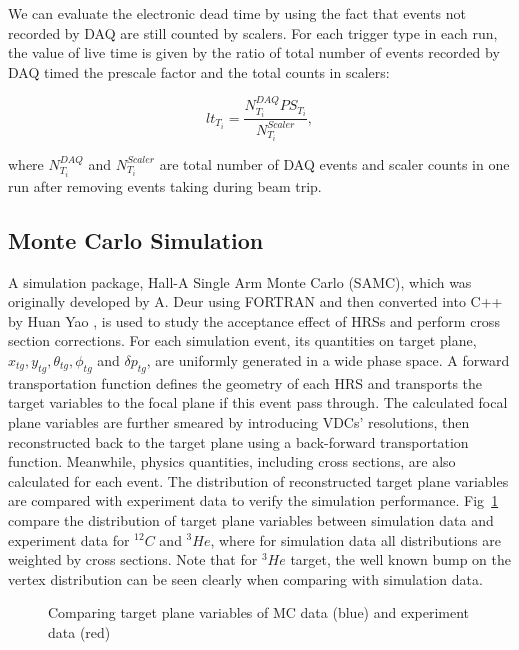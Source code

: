 We can evaluate the electronic dead time by using the fact that events not recorded by DAQ are still counted by scalers. For each trigger type in each run, the value of live time is given by the ratio of total number of events recorded by DAQ timed the prescale factor and the total counts in scalers:

\begin{equation}
  lt_{T_{i}} = \frac{N_{T_{i}}^{DAQ} PS_{T_{i}}}{N_{T_{i}}^{Scaler}},
\end{equation}

where $N_{T_{i}}^{DAQ}$ and $N_{T_{i}}^{Scaler}$ are total number of DAQ events and scaler counts in one run after removing events taking during beam trip.

\subsection{Monte Carlo Simulation}

A simulation package, Hall-A Single Arm Monte Carlo (SAMC), which was originally developed by A. Deur \cite{} using FORTRAN and then converted into C++ by Huan Yao \cite{}, is used to study the acceptance effect of HRSs and perform cross section corrections. For each simulation event, its quantities on target plane, $x_{tg},y_{tg}, \theta_{tg}, \phi_{tg}$ and $\delta p_{tg}$, are uniformly generated in a wide phase space. A forward transportation function defines the  geometry of each HRS and transports the target variables to the focal plane if this event pass through. The calculated focal plane variables are further smeared by introducing VDCs' resolutions, then reconstructed back to the target plane  using a back-forward transportation function. Meanwhile, physics quantities, including cross sections, are also calculated for each event. The distribution of reconstructed target plane variables are compared with experiment data to verify the simulation performance. Fig~\ref{samc_tg} compare the distribution of target plane variables between simulation data and experiment data for $^{12}C$ and $^{3}He$, where for simulation data all distributions are weighted by cross sections. Note that for $^{3}He$ target, the well known bump on the vertex distribution can be seen clearly when comparing with simulation data.

\begin{figure}[!h]
 \begin{center}
 \caption[Comparing MC data and experiment data]{Comparing target plane variables of MC data (blue) and experiment data (red)}
 \label{samc_tg}
\end{center}
\end{figure}


